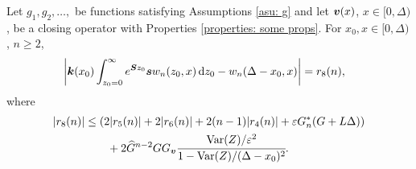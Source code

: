 \begin{cor}\label{cor: ahjg}
	Let \(g_1,g_2,\dots,\) be functions satisfying Assumptions \ref{asu: g} and let \({\boldsymbol v}(x)\), \(x\in[0,\Delta)\), be a closing operator with Properties \ref{properties: some props}. For \(x_0,x\in\mathcal [0,\Delta)\), \(n\geq 2\), 
	\begin{align}
		&\left|\boldsymbol k(x_0) \int_{z_0=0}^\infty e^{\boldsymbol Sz_0}\boldsymbol sw_n(z_0,x)\, \mathrm{d} z_0 - w_n(\Delta - x_0,x) \right| \nonumber
		= r_8(n),
	\end{align}
	where 
	\begin{align*}
		|r_8(n)|&\leq  \left( 2|r_5(n)| + 2|r_6(n)| + 2(n-1)|r_4(n)| + \varepsilon G_n^{*}(G+L\Delta) \right) \\&\qquad{}+ 2\widehat G^{n-2}GG_{\boldsymbol v}\cfrac{\mathrm{Var}(Z)/\varepsilon^2}{1-\mathrm{Var}(Z)/(\Delta-x_0)^2}.
	\end{align*}
\end{cor}
